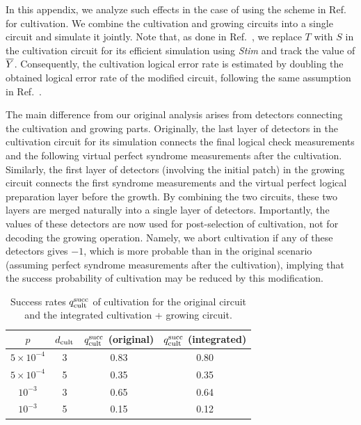 \documentclass[
 prx,
 reprint,
 superscriptaddress,
 longbibliography,
 dvipsnames
]{revtex4-2}
\begin{document}
In this appendix, we analyze such effects in the case of using the scheme in Ref.~\cite{gidney2024magic} for cultivation.
We combine the cultivation and growing circuits into a single circuit and simulate it jointly.
Note that, as done in Ref.~\cite{gidney2024magic}, we replace $T$ with $S$ in the cultivation circuit for its efficient simulation using \textit{Stim} \cite{gidney2021stim} and track the value of $\overline{Y}$.
Consequently, the cultivation logical error rate is estimated by doubling the obtained logical error rate of the modified circuit, following the same assumption in Ref.~\cite{gidney2024magic}.

The main difference from our original analysis arises from detectors connecting the cultivation and growing parts.
Originally, the last layer of detectors in the cultivation circuit for its simulation connects the final logical check measurements and the following virtual perfect syndrome measurements after the cultivation.
Similarly, the first layer of detectors (involving the initial patch) in the growing circuit connects the first syndrome measurements and the virtual perfect logical preparation layer before the growth.
By combining the two circuits, these two layers are merged naturally into a single layer of detectors.
Importantly, the values of these detectors are now used for post-selection of cultivation, not for decoding the growing operation.
Namely, we abort cultivation if any of these detectors gives $-1$, which is more probable than in the original scenario (assuming perfect syndrome measurements after the cultivation), implying that the success probability of cultivation may be reduced by this modification.

\begin{table}[bt!]
\centering
\begin{ruledtabular}
\begin{tabular}{cccc}
$p$ & $d_\mathrm{cult}$ & $q_{\mathrm{cult}}^{\mathrm{succ}}$ (original) & $q_{\mathrm{cult}}^{\mathrm{succ}}$ (integrated) \\ \hline
$5 \times 10^{-4}$ & 3 & 0.83 & 0.80 \\
$5 \times 10^{-4}$ & 5 & 0.35 & 0.35 \\
$10^{-3}$ & 3 & 0.65 & 0.64 \\
$10^{-3}$ & 5 & 0.15 & 0.12
\end{tabular}
\end{ruledtabular}
\caption{Success rates $q_{\mathrm{cult}}^{\mathrm{succ}}$ of cultivation for the original circuit \cite{gidney2024magic} and the integrated cultivation + growing circuit.}
\label{table:cultivation_succ_rate_org_int_comparison}
\end{table}
\end{document}
